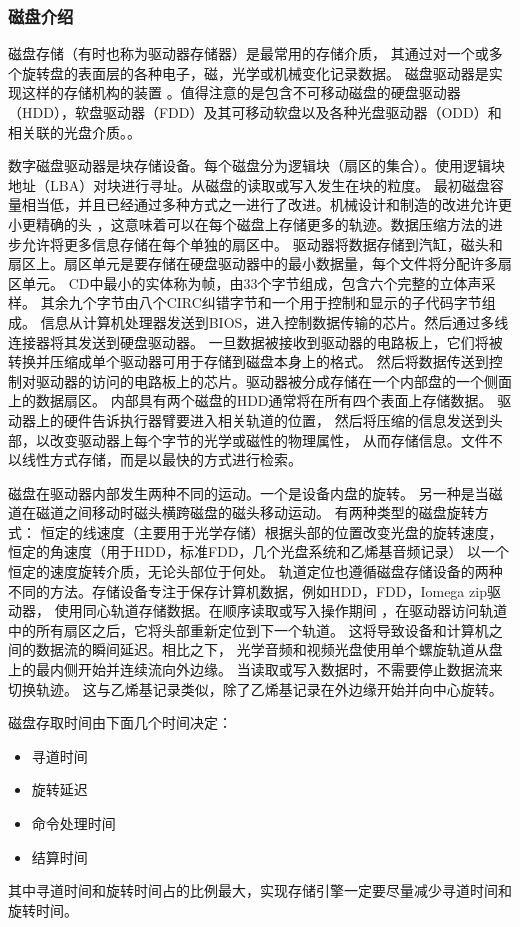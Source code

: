 \subsubsection{磁盘介绍}
磁盘存储（有时也称为驱动器存储器）是最常用的存储介质，
其通过对一个或多个旋转盘的表面层的各种电子，磁，光学或机械变化记录数据。
磁盘驱动器是实现这样的存储机构的装置
。值得注意的是包含不可移动磁盘的硬盘驱动器（HDD），软盘驱动器（FDD）及其可移动软盘以及各种光盘驱动器（ODD）和相关联的光盘介质。。

数字磁盘驱动器是块存储设备。每个磁盘分为逻辑块（扇区的集合）。使用逻辑块地址（LBA）对块进行寻址。从磁盘的读取或写入发生在块的粒度。
最初磁盘容量相当低，并且已经通过多种方式之一进行了改进。机械设计和制造的改进允许更小更精确的头
，这意味着可以在每个磁盘上存储更多的轨迹。数据压缩方法的进步允许将更多信息存储在每个单独的扇区中。
驱动器将数据存储到汽缸，磁头和扇区上。扇区单元是要存储在硬盘驱动器中的最小数据量，每个文件将分配许多扇区单元。
CD中最小的实体称为帧，由33个字节组成，包含六个完整的立体声采样。
其余九个字节由八个CIRC纠错字节和一个用于控制和显示的子代码字节组成。
信息从计算机处理器发送到BIOS，进入控制数据传输的芯片。然后通过多线连接器将其发送到硬盘驱动器。
一旦数据被接收到驱动器的电路板上，它们将被转换并压缩成单个驱动器可用于存储到磁盘本身上的格式。
然后将数据传送到控制对驱动器的访问的电路板上的芯片。驱动器被分成存储在一个内部盘的一个侧面上的数据扇区。
内部具有两个磁盘的HDD通常将在所有四个表面上存储数据。
驱动器上的硬件告诉执行器臂要进入相关轨道的位置，
然后将压缩的信息发送到头部，以改变驱动器上每个字节的光学或磁性的物理属性，
从而存储信息。文件不以线性方式存储，而是以最快的方式进行检索。

磁盘在驱动器内部发生两种不同的运动。一个是设备内盘的旋转。
另一种是当磁道在磁道之间移动时磁头横跨磁盘的磁头移动运动。
有两种类型的磁盘旋转方式：
恒定的线速度（主要用于光学存储）根据头部的位置改变光盘的旋转速度，
恒定的角速度（用于HDD，标准FDD，几个光盘系统和乙烯基音频记录）
以一个恒定的速度旋转介质，无论头部位于何处。
轨道定位也遵循磁盘存储设备的两种不同的方法。存储设备专注于保存计算机数据，例如HDD，FDD，Iomega zip驱动器，
使用同心轨道存储数据。在顺序读取或写入操作期间
，在驱动器访问轨道中的所有扇区之后，它将头部重新定位到下一个轨道。
这将导致设备和计算机之间的数据流的瞬间延迟。相比之下，
光学音频和视频光盘使用单个螺旋轨道从盘上的最内侧开始并连续流向外边缘。
当读取或写入数据时，不需要停止数据流来切换轨迹。
这与乙烯基记录类似，除了乙烯基记录在外边缘开始并向中心旋转。

磁盘存取时间由下面几个时间决定：
\begin{itemize}
	\item 寻道时间
	\item 旋转延迟
	\item 命令处理时间
	\item 结算时间
\end{itemize}
其中寻道时间和旋转时间占的比例最大，实现存储引擎一定要尽量减少寻道时间和旋转时间。
